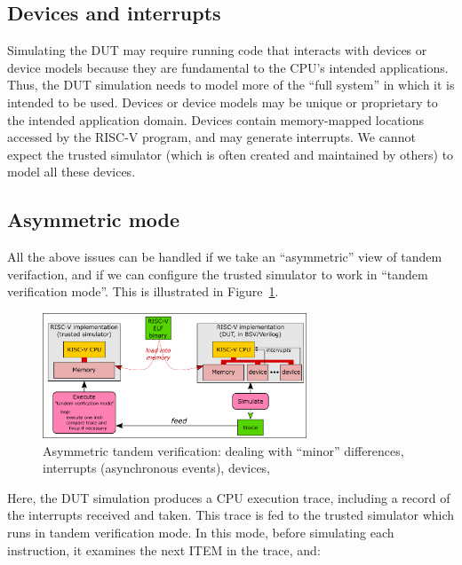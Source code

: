 
\subsection{Devices and interrupts}

Simulating the DUT may require running code that interacts with
devices or device models because they are fundamental to the CPU's
intended applications.  Thus, the DUT simulation needs to model more
of the ``full system'' in which it is intended to be used.  Devices or
device models may be unique or proprietary to the intended application
domain.  Devices contain memory-mapped locations accessed by the
RISC-V program, and may generate interrupts.  We cannot expect the
trusted simulator (which is often created and maintained by others) to
model all these devices.


\subsection{Asymmetric mode}

All the above issues can be handled if we take an ``asymmetric'' view
of tandem verifaction, and if we can configure the trusted simulator
to work in ``tandem verification mode''.  This is illustrated in
Figure~\ref{Fig_tandem_verification_II}.
\begin{figure}[htbp]
  \centerline{\includegraphics[width=0.7\textwidth,angle=0]
                              {Figures/Fig_tandem_verification_II}}
  \caption{\label{Fig_tandem_verification_II}
           Asymmetric tandem verification: dealing with ``minor'' differences,
           interrupts (asynchronous events), devices, {\etc}}
\end{figure}

Here, the DUT simulation produces a CPU execution trace, including a
record of the interrupts received and taken.  This trace is fed to the
trusted simulator which runs in tandem verification mode.  In this
mode, before simulating each instruction, it examines the next ITEM in
the trace, and:

